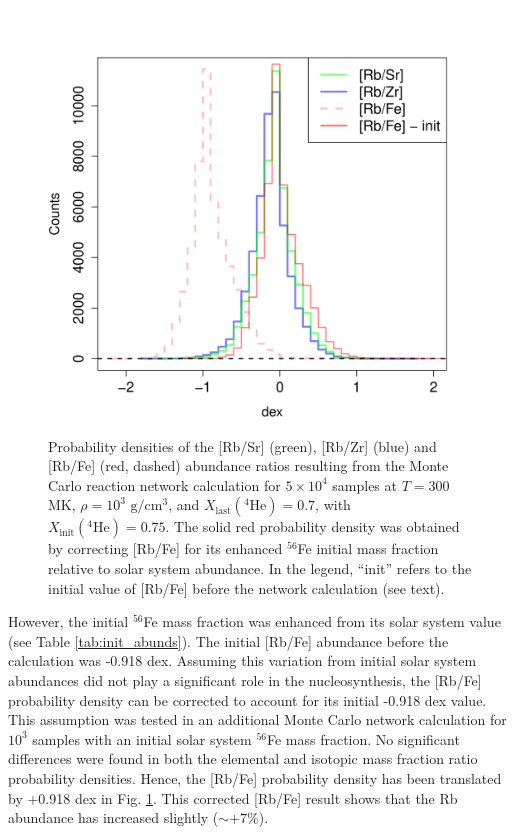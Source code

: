 \begin{figure}[t]
\centering
\includegraphics[width=4.55in]{Chapter-3/figs/Hist_Ele_Dex_Ratio_ModFe.png}
\caption{\label{fig:RbZr_Hist}Probability densities of the [Rb/Sr] (green), [Rb/Zr] (blue) and [Rb/Fe] (red, dashed) abundance ratios resulting from the Monte Carlo reaction network calculation for $5 \times 10^{4}$ samples at $T = 300$ MK, $\rho = 10^{3}$ $\mathrm{g}/\mathrm{cm}^{3}$, and $X_{\mathrm{last}}(^{4}\mathrm{He}) = 0.7$, with $X_{\mathrm{init}}(^{4}\mathrm{He}) = 0.75$. The solid red probability density was obtained by correcting [Rb/Fe] for its enhanced $^{56}$Fe initial mass fraction relative to solar system abundance. In the legend, ``init'' refers to the initial value of [Rb/Fe] before the network calculation (see text).}
\end{figure}

However, the initial $^{56}$Fe mass fraction was enhanced from its solar system value (see Table \ref{tab:init_abunds}). The initial [Rb/Fe] abundance before the calculation was -0.918 dex. Assuming this variation from initial solar system abundances did not play a significant role in the nucleosynthesis, the [Rb/Fe] probability density can be corrected to account for its initial -0.918 dex value. This assumption was tested in an additional Monte Carlo network calculation for $10^{3}$ samples with an initial solar system $^{56}$Fe mass fraction. No significant differences were found in both the elemental and isotopic mass fraction ratio probability densities. Hence, the [Rb/Fe] probability density has been translated by +0.918 dex in Fig. \ref{fig:RbZr_Hist}. This corrected [Rb/Fe] result shows that the Rb abundance has increased slightly ($\sim +7\%$).

